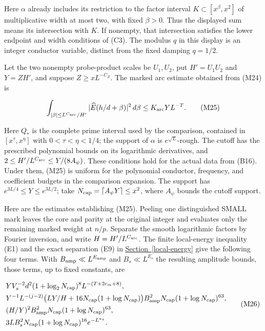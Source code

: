 Here \(\alpha\) already includes its restriction to the factor interval
\(K\subset[x^\beta,x^2]\) of multiplicative width at most two, with
fixed \(\beta>0\). Thus the displayed sum means its intersection with
\(K\). If nonempty, that intersection satisfies the lower endpoint and
width conditions of (C3). The modulus \(q\) in this display is an
integer conductor variable, distinct from the fixed damping \(q=1/2\).

Let the two nonempty probe-product scales be \(U_1,U_2\), put
\(H'=U_1U_2\) and \(Y=ZH'\), and suppose \(Z\ge xL^{-C_Z}\). The marked
arc estimate obtained from (M24) is

\[
\int_{|\beta|\le L^{C_{\rm arc}}/H'}
 |\widehat E(h/d+\beta)|^2\,d\beta
 \le K_{\rm arc}YL^{-T}. \tag{M25}
\]

Here \(Q_*\) is the complete prime interval used by the comparison,
contained in \([x^\tau,x^\eta]\) with \(0<\tau<\eta<1/4\); the support
of \(\alpha\) is \(e^{\sqrt L}\)-rough. The cutoff has the prescribed
polynomial bounds on its logarithmic derivatives, and
\(2\le H'/L^{C_{\rm arc}}\le Y/(8A_\psi)\). These conditions hold for
the actual data from (B16). Under them, (M25) is uniform for the
polynomial conductor, frequency, and coefficient budgets in the
comparison expansion. The support has \(e^{3L/4}\le Y\le e^{3L/2}\);
take \(N_{\rm cap}=\lceil A_\psi Y\rceil\le x^2\), where \(A_\psi\)
bounds the cutoff support.

Here are the estimates establishing (M25). Peeling one distinguished
SMALL mark leaves the core and parity at the original integer and
evaluates only the remaining marked weight at \(n/p\). Separate the
smooth logarithmic factors by Fourier inversion, and write
\(H=H'/L^{C_{\rm arc}}\). The finite local-energy inequality (E1) and
the exact separation (E9) in
\protect\hyperlink{local-energy}{Section~\ref{local-energy}} give the
following four terms. With \(B_{\rm amp}\ll L^{E_{\rm amp}}\) and
\(B_s\ll L^{E_s}\) the resulting amplitude bounds, those terms, up to
fixed constants, are

\[
\begin{aligned}
&YV_s^{-2}d^2(1+\log_2N_{\rm cap})^8
                   L^{-(T+2c_m+8)},\\
&Y^{-1}L^{-(j-2)}
 \bigl(LY/H+16N_{\rm cap}(1+\log N_{\rm cap})\bigr)
 B_{\rm amp}^2N_{\rm cap}(1+\log N_{\rm cap})^{63},\\
&(H/Y)^2 B_{\rm amp}^2N_{\rm cap}(1+\log N_{\rm cap})^{63},\\
&3L B_s^2N_{\rm cap}(1+\log N_{\rm cap})^{16}e^{-L^{a_s}}.
\end{aligned} \tag{M26}
\]

